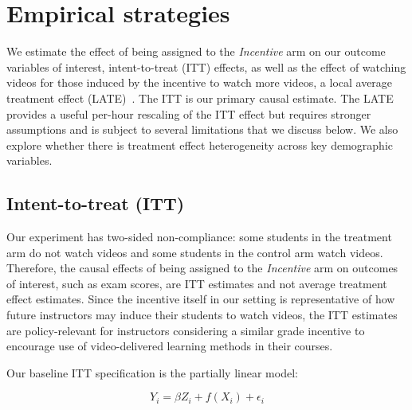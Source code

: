 
\section{Empirical strategies} \label{subsec:empiricalstrat}

We estimate the effect of being assigned to the \textit{Incentive} arm on our outcome variables of interest, intent-to-treat (ITT) effects, as well as the effect of watching videos for those induced by the incentive to watch more videos, a local average treatment effect (LATE)~\parencite{ir2015}.
The ITT is our primary causal estimate.
The LATE provides a useful per-hour rescaling of the ITT effect but requires stronger assumptions and is subject to several limitations that we discuss below.
We also explore whether there is treatment effect heterogeneity across key demographic variables.

\subsection{Intent-to-treat (ITT)}
\label{subsubsec:ITT}
Our experiment has two-sided non-compliance: some students in the treatment arm do not watch videos and some students in the control arm watch videos.
Therefore, the causal effects of being assigned to the \textit{Incentive} arm on outcomes of interest, such as exam scores, are ITT estimates and not average treatment effect estimates.
Since the incentive itself in our setting is representative of how future instructors may induce their students to watch videos, the ITT estimates are policy-relevant for instructors considering a similar grade incentive to encourage use of video-delivered learning methods in their courses.

Our baseline ITT specification is the partially linear model:

\begin{equation} \label{eq:itt_spec}
	Y_i = \beta Z_i + f(X_i) + \epsilon_i
\end{equation}

